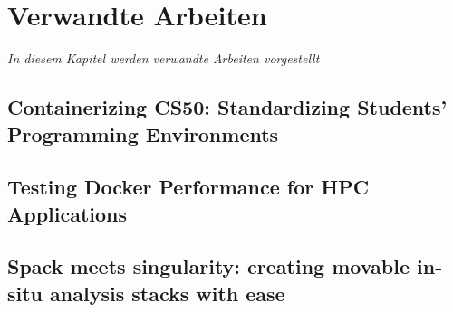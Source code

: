 \chapter{Verwandte Arbeiten}
\label{cha:related-work}
\textit{In diesem Kapitel werden verwandte Arbeiten vorgestellt}

\section{Containerizing CS50: Standardizing Students' Programming Environments \cite{malanContainerizingCS50Standardizing2024}}


\section{Testing Docker Performance for HPC Applications \cite{ermakovTestingDockerPerformance2017}}

\section{Spack meets singularity: creating movable in-situ analysis stacks with ease \cite{shudlerSpackMeetsSingularity2019}}
\cite{shudlerSpackMeetsSingularity2019}
